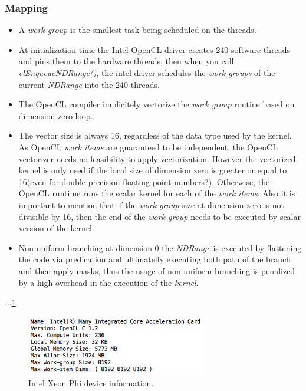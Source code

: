 \subsubsection{Mapping}
\begin{itemize}
    \item A \emph{work group} is the smallest task being scheduled on the threads\cite{opencl_phi}.
    \item At initialization time the Intel OpenCL driver creates 240 software threads and pins them to the hardware threads, then
        when you call \emph{clEnqueueNDRange()}, the intel driver schedules the \emph{work groups} of the current \emph{NDRange}
        into the 240 threads\cite{opencl_phi}.
    \item The OpenCL compiler implicitely vectorize the \emph{work group} routine based on dimension zero loop.
    \item The vector size is always 16, regardless of the data type used by the kernel. As OpenCL \emph{work items} are guaranteed
        to be independent, the OpenCL vectorizer needs no feasibility to apply vectorization. However the vectorized kernel is only
        used if the local size of dimension zero is greater or equal to 16(even for double precision floating point numbers?). 
        Otherwise, the OpenCL runtime runs the scalar kernel for each of the \emph{work items}. Also it is important to mention that
        if the \emph{work group} size at dimension zero is not divisible by 16, then the end of the \emph{work group} needs to be 
        executed by scalar version of the kernel\cite{opencl_phi}.
    \item Non-uniform branching at dimension 0 the \emph{NDRange} is executed by flattening the code via predication and 
        ultimatelly executing both path of the branch and then apply masks, thus the usage of non-uniform branching is penalized by 
        a high overhead in the execution of the \emph{kernel}\cite{opencl_phi}.
\end{itemize}

\par{...\ref{PhiDeviceInfo}}

\begin{figure}[!h]
    \centering
    \includegraphics[width=0.7\textwidth]{figures/phi_device_info.png}
    \caption{Intel Xeon Phi device information.}
    \label{PhiDeviceInfo}
\end{figure}



